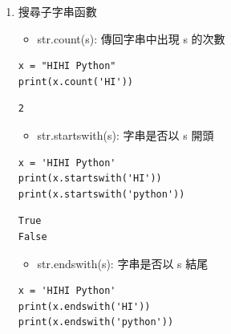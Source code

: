 \documentclass[a4paper,12pt]{article}
\begin{document}
\begin{enumerate}
\lstset{breaklines=true,language=Python,label= ,caption= ,captionpos=b,firstnumber=1,numbers=left}
\begin{lstlisting}
print("4".isdecimal())
print("4".isdigit())
print("4".isnumeric())
print("Ⅳ".isdecimal())
print("Ⅳ".isdigit())
print("Ⅳ".isnumeric())
print("四".isdecimal())
print("四".isdigit())
print("四".isnumeric())
\end{lstlisting}

\begin{verbatim}
True
True
True
False
False
True
False
False
True
\end{verbatim}


\begin{itemize}
\item str.isspace(): 字串是否為空白\\
\item str.istitle(): 字串是否每個單字\\
\end{itemize}

\item 搜尋子字串函數
\label{sec:org39dc515}
\begin{itemize}
\item str.count(s): 傳回字串中出現 s 的次數\\
\end{itemize}
\lstset{breaklines=true,language=Python,label= ,caption= ,captionpos=b,firstnumber=1,numbers=left}
\begin{lstlisting}
x = "HIHI Python"
print(x.count('HI'))
\end{lstlisting}

\begin{verbatim}
2
\end{verbatim}


\begin{itemize}
\item str.startswith(s): 字串是否以 s 開頭\\
\end{itemize}
\lstset{breaklines=true,language=Python,label= ,caption= ,captionpos=b,firstnumber=1,numbers=left}
\begin{lstlisting}
x = 'HIHI Python'
print(x.startswith('HI'))
print(x.startswith('python'))
\end{lstlisting}

\begin{verbatim}
True
False
\end{verbatim}


\begin{itemize}
\item str.endswith(s): 字串是否以 s 結尾\\
\end{itemize}
\lstset{breaklines=true,language=Python,label= ,caption= ,captionpos=b,firstnumber=1,numbers=left}
\begin{lstlisting}
x = 'HIHI Python'
print(x.endswith('HI'))
print(x.endswith('python'))
\end{lstlisting}


\end{enumerate}
\end{document}
